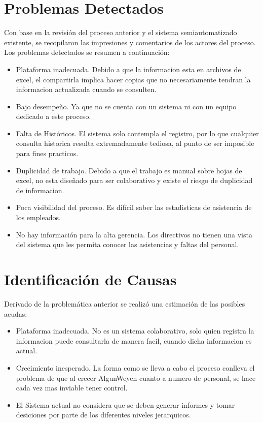 \documentclass[10pt]{book}
\newcommand{\cliente}{AlgunWey}
\begin{document}
\section{Problemas Detectados}
	
	Con base en la revisión del proceso anterior y el sistema semiautomatizado existente, se recopilaron las impresiones y comentarios de los actores del proceso. Los problemas detectados se resumen a continuación:
	
	\begin{itemize}
		\item Plataforma inadecuada. Debido a que la informacion esta en archivos de excel, el compartirla implica hacer copias que no necesariamente tendran la informacion actualizada cuando se consulten.
		\item Bajo desempeño. Ya que no se cuenta con un sistema ni con un equipo dedicado a este proceso.
		\item Falta de Históricos. El sistema solo contempla el registro, por lo que cualquier consulta historica resulta extremadamente tediosa, al punto de ser imposible para fines practicos.
		\item Duplicidad de trabajo. Debido a que el trabajo es manual sobre hojas de excel, no esta diseñado para ser colaborativo y existe el riesgo de duplicidad de informacion.
		\item Poca visibilidad del proceso. Es difícil saber las estadisticas de asistencia de los empleados.
		\item No hay información para la alta gerencia. Los directivos no tienen una vista del sistema que les permita conocer las asistencias y faltas del personal.
	\end{itemize}

\section{Identificación de Causas}

Derivado de la problemática anterior se realizó una estimación de las posibles acudas:

\begin{itemize}	
	\item Plataforma inadecuada. No es un sistema colaborativo, solo quien registra la informacion puede consultarla de manera facil, cuando dicha informacion es actual.
	\item Crecimiento inesperado. La forma como se lleva a cabo el proceso conlleva el problema de que al crecer \cliente en cuanto a numero de personal, se hace cada vez mas inviable tener control.
	\item El Sistema actual no considera que se deben generar informes y tomar desiciones por parte de los diferentes niveles jerarquicos.
\end{itemize}
\end{document}
